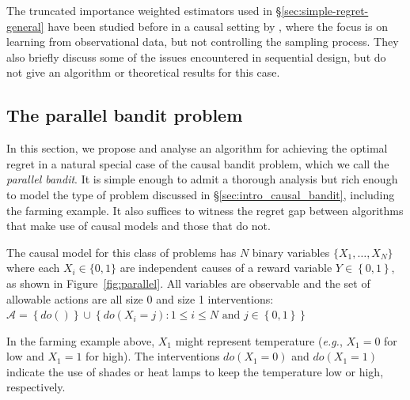 \documentclass[11pt,a4paper,twoside]{report}
\newcommand{\eg}{\textit{e.g.}}
\newcommand{\set}[1]{\left\{#1\right\}}
\theoremstyle{plain}
\theoremstyle{definition}
\begin{document}
The truncated importance weighted estimators used in \S\ref{sec:simple-regret-general} have been studied before in a causal setting by \citet{Bottou2013}, 
where the focus is on learning from observational data, but not controlling the sampling process. They also briefly discuss some of the issues 
encountered in sequential design, but do not give an algorithm or theoretical results for this case.


\subsection{The parallel bandit problem}
\label{sec:simple-regret}
In this section, we propose and analyse an algorithm for achieving the optimal regret in a natural special case of the causal bandit problem, which we call the {\it parallel bandit}.
It is simple enough to admit a thorough analysis but rich enough to model the type of problem discussed in \S\ref{sec:intro_causal_bandit}, including the farming example. It also suffices to witness the regret gap between algorithms that make use of causal models and those that do not.

The causal model for this class of problems has $N$ binary variables $\{ X_1, \ldots, X_N \}$ where each $X_i \in \{0,1\}$ are independent causes of a reward variable $Y \in \set{0,1}$, as shown in Figure~\ref{fig:parallel}. All variables are observable and the set of allowable actions are all size 0 and size 1 interventions: $\mathcal{A} = \set{do()} \cup \set{ do(X_i = j) \colon 1 \leq i \leq N \text{ and } j \in \set{0,1}}$

In the farming example above, $X_1$ might represent temperature (\eg, $X_1=0$ for low and $X_1=1$ for high). The interventions $do(X_1 = 0)$ and $do(X_1 = 1)$ indicate the use of shades or heat lamps to keep the temperature low or high, respectively.
\end{document}
